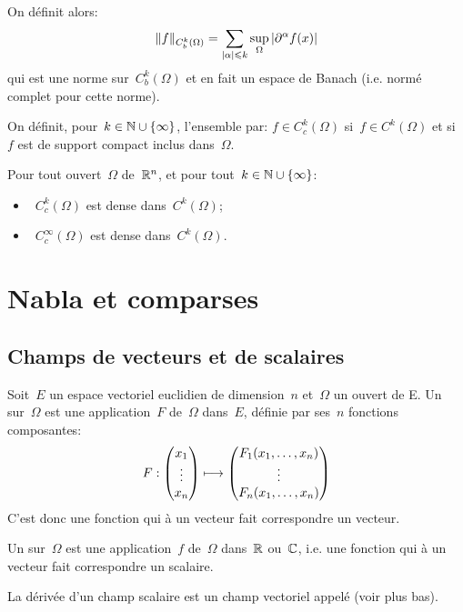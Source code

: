 On définit alors:
\begin{equation}
\|f\|_{C^k_b(\Omega)}=\displaystyle\sum_{|\alpha|\leqslant k} \sup_{\Omega} |\partial^\alpha f(x)|
\end{equation}
qui est une norme sur~$C^k_b(\Omega)$ et en fait un espace de Banach (i.e. normé complet pour cette norme).

\medskip
\begin{definition}\label{Def-Cc}
On définit, pour~$k\in\mathbb N\cup\{\infty\}$, l'ensemble  par:
$f\in C_c^k(\Omega)$ si~$f\in C^k(\Omega)$ et si~$f$ est de support compact inclus dans~$\Omega$.
\end{definition}
Pour tout ouvert~$\Omega$ de~$\mathbb R^n$, et pour tout~$k\in\mathbb N\cup\{\infty\}$:
\begin{itemize}
  \item~$C_c^k(\Omega)$ est dense dans~$C^k(\Omega)$;
  \item~$C_c^\infty(\Omega)$ est dense dans~$C^k(\Omega)$.
\end{itemize}

\medskip
\section{Nabla et comparses}

\subsection{Champs de vecteurs et de scalaires}

\begin{definition}
Soit~$E$ un espace vectoriel euclidien de dimension~$n$ et~$\Omega$ un ouvert de E.
Un  sur~$\Omega$ est une application~$F$ de~$\Omega$ dans~$E$, définie par ses~$n$ fonctions composantes:
\begin{equation}
  F: \VV*{x_1\\\vdots\\x_n} \longmapsto \VV*{F_1(x_1,\dots,x_n)\\ \vdots\\ F_n(x_1,\dots,x_n)}
\end{equation}
C'est donc une fonction qui à un vecteur fait correspondre un vecteur.
\end{definition}

\begin{definition}
Un  sur~$\Omega$ est une application~$f$ de~$\Omega$ dans~$\mathbb R$ ou~$\mathbb C$, i.e. une fonction qui à un vecteur fait correspondre un scalaire.
\end{definition}
La dérivée d'un champ scalaire est un champ vectoriel appelé  (voir plus bas).


